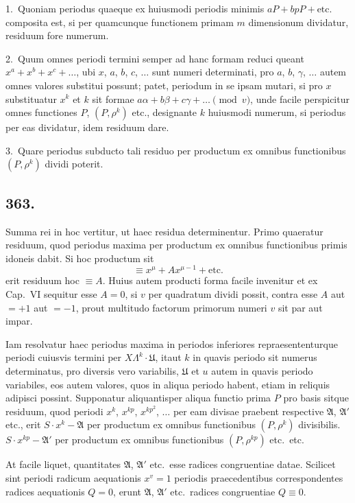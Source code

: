 \documentclass[12pt]{article}
\begin{document}
1.~Quoniam periodus quaeque ex huiusmodi periodis minimis $aP+bpP+\text{etc.}$ composita est, si per quamcunque functionem primam $m$ dimensionum dividatur, residuum fore numerum.

2.~Quum omnes periodi termini semper ad hanc formam reduci queant $x^a+x^b+x^c+\ldots$, ubi $x$, $a$, $b$, $c$, $\ldots$ sunt numeri determinati, pro $a$, $b$, $\gamma$, $\ldots$ autem omnes valores substitui possunt; patet, periodum in se ipsam mutari, si pro $x$ substituatur $x^k$ et $k$ sit formae $a\alpha+b\beta+c\gamma+\ldots\pmod{v}$, unde facile perspicitur omnes functiones $P$, $(P,\rho^k)$ etc., designante $k$ huiusmodi numerum, si periodus per eas dividatur, idem residuum dare.

3.~Quare periodus subducto tali residuo per productum ex omnibus functionibus $(P,\rho^k)$ dividi poterit.

\subsection*{363.}

Summa rei in hoc vertitur, ut haec residua determinentur. Primo quaeratur residuum, quod periodus maxima per productum ex omnibus functionibus primis idoneis dabit. Si hoc productum sit
\[
\equiv x^{\mu}+Ax^{\mu-1}+\text{etc.}
\]
erit residuum hoc $\equiv A$. Huius autem producti forma facile invenitur et ex Cap.~VI sequitur esse $A=0$, si $v$ per quadratum dividi possit, contra esse $A$ aut $=+1$ aut $=-1$, prout multitudo factorum primorum numeri $v$ sit par aut impar.

Iam resolvatur haec periodus maxima in periodos inferiores repraesententurque periodi cuiusvis termini per $X\Lambda^k\cdot\mathfrak{U}$, itaut $k$ in quavis periodo sit numerus determinatus, pro diversis vero variabilis, $\mathfrak{U}$ et $u$ autem in quavis periodo variabiles, eos autem valores, quos in aliqua periodo habent, etiam in reliquis adipisci possint. Supponatur aliquantisper aliqua functio prima $P$ pro basis sitque residuum, quod periodi $x^k$, $x^{kp}$, $x^{kp^2}$, $\ldots$ per eam divisae praebent respective $\mathfrak{A}$, $\mathfrak{A}'$ etc., erit $S\cdot x^k-\mathfrak{A}$ per productum ex omnibus functionibus $(P,\rho^k)$ divisibilis. $S\cdot x^{kp}-\mathfrak{A}'$ per productum ex omnibus functionibus $(P,\rho^{kp})$ etc.~etc.

At facile liquet, quantitates $\mathfrak{A}$, $\mathfrak{A}'$ etc.~esse radices congruentiae datae. Scilicet sint periodi radicum aequationis $x^v=1$ periodis praecedentibus correspondentes radices aequationis $Q=0$, erunt $\mathfrak{A}$, $\mathfrak{A}'$ etc.~radices congruentiae $Q\equiv 0$.
\end{document}
